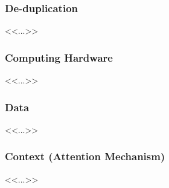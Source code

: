 \subsubsection{De-duplication}
<<...>>

\subsubsection{Computing Hardware}
<<...>>

\subsubsection{Data}
<<...>>

\subsubsection{Context (Attention Mechanism)}
<<...>>